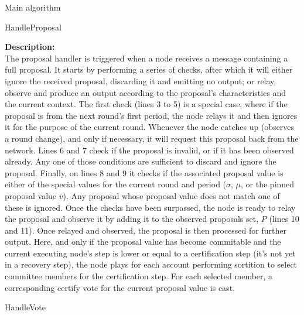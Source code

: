 \documentclass[10pt,a4paper]{article}
\begin{document}
\begin{section}{Main algorithm}
\begin{subsection}{HandleProposal}
    
    \noindent \textbf{Description:}\\
The proposal handler is triggered when a node receives a message containing a full proposal.
It starts by performing a series of checks, after which it will either ignore the received
proposal, discarding it and emitting no output; or relay, observe and produce an output
according to the proposal's characteristics and the current context.
The first check (lines 3 to 5) is a special case, where if the proposal is from the next round's 
first period, the node relays it and then ignores it for the purpose of the current round. 
Whenever the node catches up (observes a round change), and only if necessary, it will request 
this proposal back from the network.
Lines 6 and 7 check if the proposal is invalid, or if it has been observed already. Any one of those
conditions are sufficient to discard and ignore the proposal.
Finally, on lines 8 and 9 it checks if the associated proposal value is either of the special values for the current
round and period ($\sigma$, $\mu$, or the pinned proposal value $\bar{v}$). Any proposal whose proposal value does not match
one of these is ignored.
Once the checks have been surpassed, the node is ready to relay the proposal and observe it by adding
it to the observed proposals set, $P$ (lines 10 and 11).
Once relayed and observed, the proposal is then processed for further output.
Here, and only if the proposal value has become commitable and the current executing node's step is lower or equal
to a certification step (it's not yet in a recovery step), the node plays for each account performing sortition
to select committee members for the certification step. For each selected member, a corresponding certify vote for
the current proposal value is cast.


\end{subsection}


\begin{subsection}{HandleVote}\label{ssect:HandleVote}

    \begin{algorithm}[H]
        \begin{algorithmic}[1]

            
            

\end{algorithmic}
\end{algorithm}
\end{subsection}
\end{section}
\end{document}

